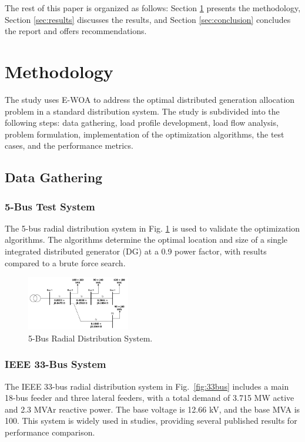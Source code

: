 \documentclass[conference]{IEEEtran}
\begin{document}
The rest of this paper is organized as follows: Section \ref{sec:methodology} presents the methodology, Section \ref{sec:results} discusses the results, and Section \ref{sec:conclusion} concludes the report and offers recommendations.

\vspace{-5pt}
\section{Methodology}\label{sec:methodology}
The study uses E-WOA to address the optimal distributed generation allocation problem in a standard distribution system. The study is subdivided into the following steps: data gathering, load profile development, load flow analysis, problem formulation, implementation of the optimization algorithms, the test cases, and the performance metrics.


\subsection{Data Gathering}
\subsubsection{5-Bus Test System}
The 5-bus radial distribution system in Fig. \ref{fig:5buswithdata} is used to validate the optimization algorithms. The algorithms determine the optimal location and size of a single integrated distributed generator (DG) at a 0.9 power factor, with results compared to a brute force search.

\vspace{-5pt}
\begin{figure}[htbp]
	\centerline{\includegraphics[width=0.4\textwidth]{5buswithdata.png}}
	\caption{5-Bus Radial Distribution System.}
	\vspace{-15pt}
	\label{fig:5buswithdata}
\end{figure}

\subsubsection{IEEE 33-Bus System}
The IEEE 33-bus radial distribution system in Fig.~\ref{fig:33bus} includes a main 18-bus feeder and three lateral feeders, with a total demand of 3.715 MW active and 2.3 MVAr reactive power. The base voltage is 12.66 kV, and the base MVA is 100. This system is widely used in studies, providing several published results for performance comparison.
\end{document}
